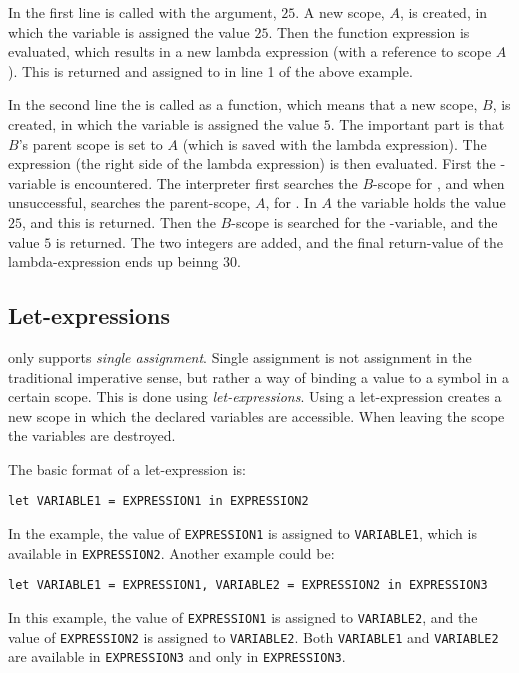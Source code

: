 
In the first line  is called with the argument, $25$. A new scope, $A$,
is created, in which the variable  is assigned the value $25$. Then the function
expression is evaluated, which results in a new lambda expression (with a reference to scope $A$).
This is returned and assigned to  in line 1 of the above example.

In the second line the  is called as a function, which means that a new scope, $B$,
is created, in which the variable  is assigned the value $5$. The important part is
that $B$'s parent scope is set to $A$ (which is saved with the lambda expression). The expression
(the right side of the lambda expression) is then evaluated. First the -variable is
encountered. The interpreter first searches the $B$-scope for , and when unsuccessful,
searches the parent-scope, $A$, for . In $A$ the variable  holds the value
$25$, and this is returned. Then the $B$-scope is searched for the -variable, and the value
$5$ is returned. The two integers are added, and the final return-value of the lambda-expression
ends up beinng $30$.

\subsection{Let-expressions}

\productname{} only supports \emph{single assignment}. Single assignment is not assignment
in the traditional imperative sense, but rather a way of binding a value to a symbol in a
certain scope. This is done using \emph{let-expressions}. Using a let-expression creates a
new scope in which the declared variables are accessible. When leaving the scope the
variables are destroyed.

The basic format of a let-expression is:

\texttt{let VARIABLE1 = EXPRESSION1 in EXPRESSION2}

In the example, the value of \texttt{EXPRESSION1} is assigned to \texttt{VARIABLE1}, which
is available in \texttt{EXPRESSION2}. Another example could be:

\texttt{let VARIABLE1 = EXPRESSION1, VARIABLE2 = EXPRESSION2 in EXPRESSION3}

In this example, the value of \texttt{EXPRESSION1} is assigned to \texttt{VARIABLE2}, and
the value of \texttt{EXPRESSION2} is assigned to \texttt{VARIABLE2}. Both \texttt{VARIABLE1}
and \texttt{VARIABLE2} are available in \texttt{EXPRESSION3} and only in \texttt{EXPRESSION3}.


